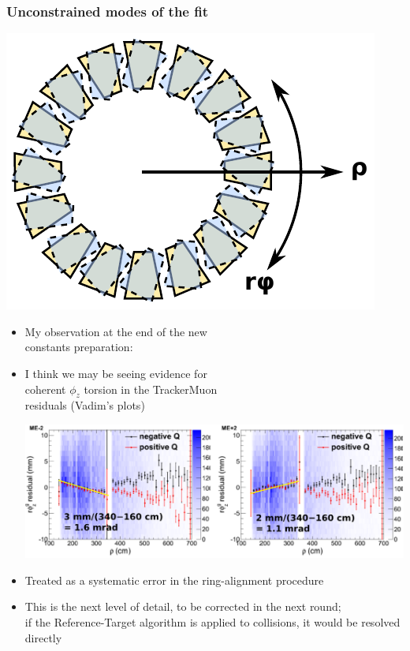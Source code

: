 \documentclass[compress]{beamer}
\begin{document}
\begin{frame}
\frametitle{Unconstrained modes of the fit}

\hfill \includegraphics[width=0.35\linewidth]{global_shifts2.pdf}

\vspace{-2.7 cm}
\begin{itemize}
\item My observation at the end of the new \\ constants preparation:

\item I think we may be seeing evidence for \\ coherent $\phi_z$ torsion
  in the TrackerMuon \\ residuals (Vadim's plots)

\includegraphics[width=\linewidth]{rphi_plots_vs_rho.pdf}

\item Treated as a systematic error in the ring-alignment procedure

\item This is the next level of detail, to be corrected in the next
  round; \\ if the Reference-Target algorithm is applied to collisions,
  it would be resolved directly
\end{itemize}
\end{frame}

\end{document}
